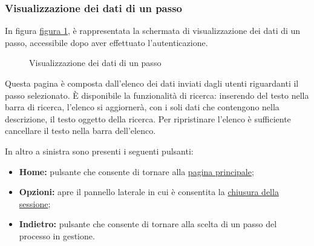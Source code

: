 \subsubsection{Visualizzazione dei dati di un passo}

In figura \hyperref[fig:Fstepdata]{figura \ref{fig:Fstepdata}}, è rappresentata la schermata di visualizzazione dei dati di un passo, accessibile dopo aver effettuato l'autenticazione.

\begin{figure}[H] \centering 
{} \caption{Visualizzazione dei dati di un passo}
\label{fig:Fstepdata}
\end{figure}

Questa pagina è composta dall'elenco dei dati inviati dagli utenti riguardanti il passo selezionato. 
È disponibile la funzionalità di ricerca: inserendo del testo nella barra di ricerca, l'elenco si aggiornerà, con i soli dati che contengono nella descrizione, il testo oggetto della ricerca.
Per ripristinare l'elenco è sufficiente cancellare il testo nella barra dell'elenco.

In altro a sinistra sono presenti i seguenti pulsanti:
\begin{itemize}
\item \textbf{Home:} pulsante che consente di tornare alla \hyperref[home]{pagina principale};
\item \textbf{Opzioni:} apre il pannello laterale in cui è consentita la \hyperref[logout]{chiusura della sessione};
\item \textbf{Indietro:} pulsante che consente di tornare alla scelta di un passo del processo in gestione.
\end{itemize}

